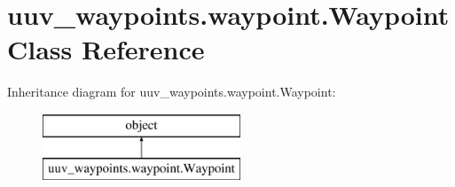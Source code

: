 \hypertarget{classuuv__waypoints_1_1waypoint_1_1Waypoint}{}\section{uuv\+\_\+waypoints.\+waypoint.\+Waypoint Class Reference}
\label{classuuv__waypoints_1_1waypoint_1_1Waypoint}
Inheritance diagram for uuv\+\_\+waypoints.\+waypoint.\+Waypoint\+:\begin{figure}[H]
\begin{center}
\leavevmode
\includegraphics[height=2.000000cm]{classuuv__waypoints_1_1waypoint_1_1Waypoint}
\end{center}
\end{figure}
